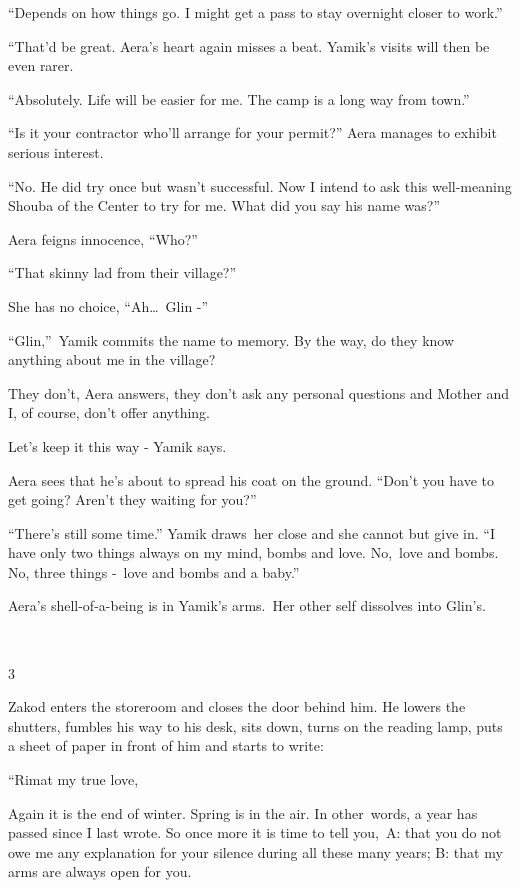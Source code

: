 \documentclass[twoside,11pt]{book}
\begin{document}
{}``Depends on how things go. I might get a pass to stay overnight closer to work.'' 

{}``That{}'d be great.{\textquotedbl} Aera's heart again misses a beat. Yamik's visits will then be even rarer. 

{}``Absolutely. Life will be easier for me. The camp is a long way from town.'' 

{}``Is it your contractor who'll arrange for your permit?'' Aera manages to exhibit serious interest. 

{}``No. He did try once but wasn't successful. Now I intend to ask this well-meaning Shouba of the Center to try for me.
What did you say his name was?'' 

Aera feigns innocence, ``Who?''~ 

{}``That skinny lad from their village?'' 

She has no choice, ``Ah{\dots}\ Glin -{}'' 

{}``Glin,{}''\ Yamik commits the name to memory. {\textquotedbl}By the way, do they know anything about me in the
village?{\textquotedbl}

{\textquotedbl}They don't{\textquotedbl}, Aera answers, {\textquotedbl}they don't ask any personal questions and Mother
and I, of course, don't offer anything.{\textquotedbl}

{\textquotedbl}Let's keep it this way -{\textquotedbl} Yamik says.

Aera sees that he's about to spread his coat on the ground. ``Don't you have to get going? Aren't they waiting for
you?'' 

{}``There's still some time.'' Yamik draws~her close and she cannot but give in. ``I have only two things always on my
mind, bombs and love. No,\ love and bombs. No, three things -\ love and bombs and a baby.'' 

Aera's shell-of-a-being is in Yamik's arms.{\ }Her other self dissolves into Glin's. 

~

3\ \ 

Zakod enters the storeroom and closes the door behind him. He lowers the shutters, fumbles his way to his desk, sits
down, turns on the reading lamp, puts a sheet of paper in front of him and starts to write:

{}``Rimat my true love,

Again it is the end of winter. Spring is in the air. In other\ words,  a year has passed since I last wrote. So once
more it is time to tell you,\ A: that you do not owe me any explanation for your silence during all these many years;
B: that my arms are always open for you.
\end{document}

